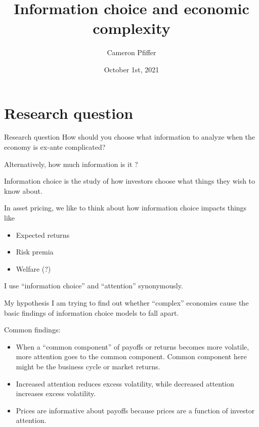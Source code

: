 \documentclass[
  ignorenonframetext,
]{beamer}
\title{Information choice and economic complexity}
\author{Cameron Pfiffer}
\date{October 1st, 2021}
\institute{University of Oregon}
\providecommand{\tightlist}{%
  \setlength{\itemsep}{0pt}\setlength{\parskip}{0pt}}
\begin{document}
\frame{\titlepage}

\hypertarget{research-question}{%
\section{Research question}\label{research-question}}

\begin{frame}{Research question}
\protect\hypertarget{research-question-1}{}
How should you choose what information to analyze when the economy is
ex-ante complicated?

Alternatively, how much information is it ?
\end{frame}

\begin{frame}{Information choice}
\protect\hypertarget{information-choice}{}
 is the study of how investors choose what
things they wish to know about.

In asset pricing, we like to think about how information choice impacts
things like

\begin{itemize}
\tightlist
\item
  Expected returns
\item
  Risk premia
\item
  Welfare (?)
\end{itemize}

I use ``information choice'' and ``attention'' synonymously.
\end{frame}

\begin{frame}{My hypothesis}
\protect\hypertarget{my-hypothesis}{}
I am trying to find out whether ``complex'' economies cause the basic
findings of information choice models to fall apart.

Common findings:

\begin{itemize}
\tightlist
\item
  When a ``common component'' of payoffs or returns becomes more
  volatile, more attention goes to the common component. Common
  component here might be the business cycle or market returns.
\item
  Increased attention reduces excess volatility, while decreased
  attention increases excess volatility.
\item
  Prices are informative about payoffs because prices are a function of
  investor attention.
\end{itemize}
\end{frame}
\end{document}
